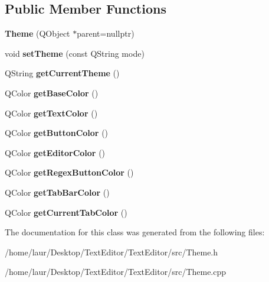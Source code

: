 \subsection*{Public Member Functions}
\begin{DoxyCompactItemize}
\item 
\mbox{\label{class_theme_ac1dc66c7172de7af417d1dbe06d2f23d}} 
{\bfseries Theme} (Q\+Object $\ast$parent=nullptr)
\item 
\mbox{\label{class_theme_ae86983ee4e3424839d430b6b496561b3}} 
void {\bfseries set\+Theme} (const Q\+String mode)
\item 
\mbox{\label{class_theme_ab380606b7394d0a0b79002b084304385}} 
Q\+String {\bfseries get\+Current\+Theme} ()
\item 
\mbox{\label{class_theme_ae79d4348899380c9bce5ba9d67dbe404}} 
Q\+Color {\bfseries get\+Base\+Color} ()
\item 
\mbox{\label{class_theme_abed9583ec721ceab2c356d411f171af4}} 
Q\+Color {\bfseries get\+Text\+Color} ()
\item 
\mbox{\label{class_theme_a24285800831874e40ef78de4ce9b7c05}} 
Q\+Color {\bfseries get\+Button\+Color} ()
\item 
\mbox{\label{class_theme_a1bd7925e17dd85bcb3e7e24dd2d3a0a3}} 
Q\+Color {\bfseries get\+Editor\+Color} ()
\item 
\mbox{\label{class_theme_a4d8c2585a6e91e2f67bdf3ac53027d26}} 
Q\+Color {\bfseries get\+Regex\+Button\+Color} ()
\item 
\mbox{\label{class_theme_a31541105a04c535b9e1dacae964c5086}} 
Q\+Color {\bfseries get\+Tab\+Bar\+Color} ()
\item 
\mbox{\label{class_theme_ad9705271e85f64ffa6f3752e9584c7e4}} 
Q\+Color {\bfseries get\+Current\+Tab\+Color} ()
\end{DoxyCompactItemize}


The documentation for this class was generated from the following files\+:\begin{DoxyCompactItemize}
\item 
/home/laur/\+Desktop/\+Text\+Editor/\+Text\+Editor/src/Theme.\+h\item 
/home/laur/\+Desktop/\+Text\+Editor/\+Text\+Editor/src/Theme.\+cpp\end{DoxyCompactItemize}
